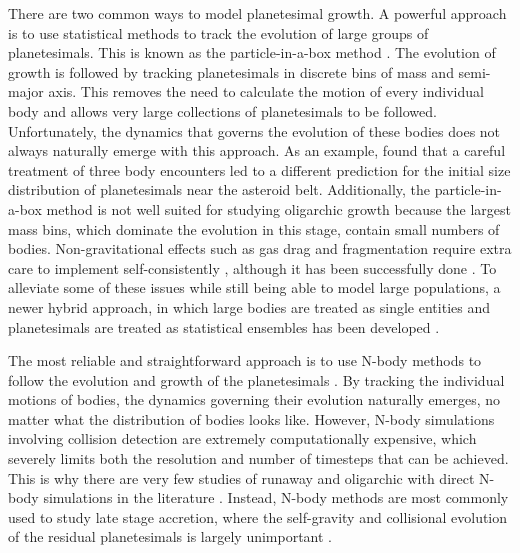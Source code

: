 \documentclass [11pt, proquest] {uwthesis}[2020/02/24]
\begin{document}
There are two common ways to model planetesimal growth. A powerful approach is to use statistical methods to track the 
evolution of large groups of planetesimals. This is known as the particle-in-a-box method \cite{greenberg78, wetherill89}. The 
evolution of growth is followed by tracking planetesimals in discrete bins of mass and semi-major axis. This removes the need to 
calculate the motion of every individual body and allows very large collections of planetesimals to be followed. Unfortunately, the 
dynamics that governs the evolution of these bodies does not always naturally emerge with this approach. As an example, 
\cite{weidenschilling11} found that a careful treatment of three body encounters led to a different prediction for the initial size 
distribution of planetesimals near the asteroid belt. Additionally, the particle-in-a-box method is not well suited for studying 
oligarchic growth because the largest mass bins, which dominate the evolution in this stage, contain small numbers of bodies. 
Non-gravitational effects such as gas drag and fragmentation require extra care to implement self-consistently 
\cite{leinhardt08}, although it has been successfully done \cite{wetherill93, chambers01}. To alleviate some of these issues 
while still being able to model large populations, a newer hybrid approach, in which large bodies are treated as single entities 
and planetesimals are treated as statistical ensembles has been developed 
\cite{weidenschilling97, kenyon06, levison12, morishima15}.

The most reliable and straightforward approach is to use N-body methods to follow the evolution and growth of the planetesimals 
\cite{lecar86}. By tracking the individual motions of bodies, the dynamics governing their evolution naturally emerges, no matter 
what the distribution of bodies looks like. However, N-body simulations involving collision detection are extremely 
computationally expensive, which severely limits both the resolution and number of timesteps that can be achieved. This is why 
there are very few studies of runaway and oligarchic with direct N-body simulations in the literature 
\cite{kokubo96, kokubo98, kokubo02, barnes09}. Instead, N-body methods are most commonly used to study late stage 
accretion, where the self-gravity and collisional evolution of the residual planetesimals is largely unimportant 
\cite{chambers98, agnor99,  chambers01, obrien06, morbidelli09}.
\end{document}
